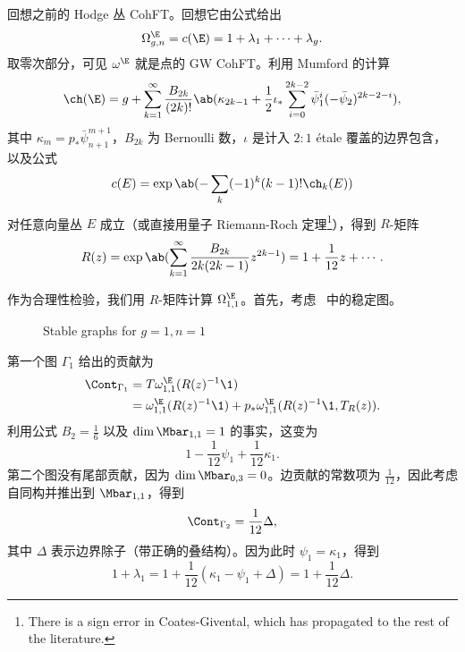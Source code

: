 \begin{exm}
    回想之前的 Hodge 丛 CohFT。回想它由公式给出
    \[ \Omega^{\E}_{g,n} = c(\E) = 1 + \lambda_1 + \cdots + \lambda_g. \]
    取零次部分，可见 \(\omega^{\E}\) 就是点的 GW CohFT。利用 Mumford 的计算
    \[ \ch(\E) = g + \sum_{k=1}^{\infty} \frac{B_{2k}}{(2k)!}\ab(\kappa_{2k-1} + \frac{1}{2}\iota_*\sum_{i=0}^{2k-2} \bar{\psi}_1^{i} (-\bar{\psi}_2)^{2k-2-i}), \]
    其中 \(\kappa_{m} = p_* \bar{\psi}_{n+1}^{m+1}\)，\(B_{2k}\) 为 Bernoulli 数，\(\iota\) 是计入 \(2:1\) \'etale 覆盖的边界包含，以及公式
    \[ c(E) = \exp \ab(-\sum_k (-1)^k (k-1)!\ch_k(E)) \]
    对任意向量丛 \(E\) 成立（或直接用量子 Riemann-Roch 定理\footnote{There is a sign error in Coates-Givental, which has propagated to the rest of the literature.}），得到 \(R\)-矩阵
    \[ R(z) = \exp\ab( \sum_{k=1}^{\infty} \frac{B_{2k}}{2k(2k-1)} z^{2k-1}) = 1+\frac{1}{12}z + \cdots. \]

    作为合理性检验，我们用 \(R\)-矩阵计算 \(\Omega_{1,1}^{\E}\)。首先，考虑~ 中的稳定图。
    \begin{figure}[htpb]
    \begin{center}
    \end{center}
    \caption{Stable graphs for $g=1, n=1$}%
    \label{fig:03graphloop}
    \end{figure}
    第一个图 \(\Gamma_1\) 给出的贡献为
    \begin{align*}
        \Cont_{\Gamma_1} &= T\omega_{1,1}^{\E}(R(z)^{-1}\1) \\
        &= \omega_{1,1}^{\E}(R(z)^{-1}\1) + p_* \omega_{1,1}^{\E}(R(z)^{-1}\1, T_R(z)).
    \end{align*}
    利用公式 \(B_2 = \frac{1}{6}\) 以及 \(\dim \Mbar_{1,1} = 1\) 的事实，这变为
    \[ 1 - \frac{1}{12}\psi_1 + \frac{1}{12} \kappa_1. \]
    第二个图没有尾部贡献，因为 \(\dim \Mbar_{0,3} = 0\)。边贡献的常数项为 \(\frac{1}{12}\)，因此考虑自同构并推出到 \(\Mbar_{1,1}\)，得到
    \[ \Cont_{\Gamma_2} = \frac{1}{12} \Delta, \]
    其中 \(\Delta\) 表示边界除子（带正确的叠结构）。因为此时 \(\psi_1 = \kappa_1\)，得到
    \[ 1+\lambda_1 = 1 + \frac{1}{12}(\kappa_1 - \psi_1 + \Delta) = 1 + \frac{1}{12} \Delta. \]
\end{exm}




